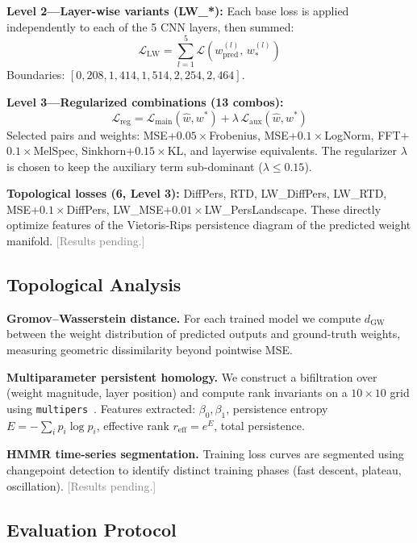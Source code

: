 \textbf{Level 2---Layer-wise variants (LW\_*):}
Each base loss is applied independently to each of the 5 CNN layers, then summed:
\begin{equation}
\mathcal{L}_{\text{LW}} = \sum_{l=1}^{5} \mathcal{L}(w^{(l)}_{\text{pred}},\, w^{(l)}_*)
\label{eq:layerwise}
\end{equation}
Boundaries: $[0, 208, 1{,}414, 1{,}514, 2{,}254, 2{,}464]$.

\textbf{Level 3---Regularized combinations (13 combos):}
\begin{equation}
\mathcal{L}_{\text{reg}} = \mathcal{L}_{\text{main}}(\hat{w}, w^*) + \lambda\,\mathcal{L}_{\text{aux}}(\hat{w}, w^*)
\label{eq:regularized}
\end{equation}
Selected pairs and weights: MSE+$0.05\times$Frobenius, MSE+$0.1\times$LogNorm, FFT+$0.1\times$MelSpec, Sinkhorn+$0.15\times$KL, and layerwise equivalents. The regularizer $\lambda$ is chosen to keep the auxiliary term sub-dominant ($\lambda \leq 0.15$).

\textbf{Topological losses (6, Level 3):} DiffPers, RTD, LW\_DiffPers, LW\_RTD, MSE+$0.1\times$DiffPers, LW\_MSE+$0.01\times$LW\_PersLandscape. These directly optimize features of the Vietoris-Rips persistence diagram of the predicted weight manifold. \textcolor{gray}{[Results pending.]}

\subsection{Topological Analysis}

\textbf{Gromov--Wasserstein distance.} For each trained model we compute $d_{\text{GW}}$ between the weight distribution of predicted outputs and ground-truth weights, measuring geometric dissimilarity beyond pointwise MSE.

\textbf{Multiparameter persistent homology.} We construct a bifiltration over (weight magnitude, layer position) and compute rank invariants on a $10\times10$ grid using \texttt{multipers}~\cite{lesnickInteractiveVisualization2015}. Features extracted: $\beta_0, \beta_1$, persistence entropy $E = -\sum_i p_i\log p_i$, effective rank $r_{\text{eff}} = e^E$, total persistence.

\textbf{HMMR time-series segmentation.} Training loss curves are segmented using changepoint detection to identify distinct training phases (fast descent, plateau, oscillation). \textcolor{gray}{[Results pending.]}

\subsection{Evaluation Protocol}

